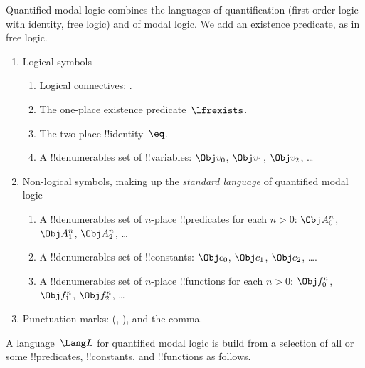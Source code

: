 \documentclass[../../../../include/open-logic-section]{subfiles}
\begin{document}


Quantified modal logic combines the languages of
quantification (first-order logic with identity, free logic) and of
modal logic. We add an existence predicate, as in free logic. 

\begin{enumerate}
\item Logical symbols
\begin{enumerate}
\item Logical connectives:
  \startycommalist
  .
\item The one-place existence predicate~$\lfrexists$.
\item The two-place !!{identity}~$\eq$.
\item A !!{denumerable}s set of !!{variable}s: $\Obj v_0$, $\Obj v_1$, $\Obj
  v_2$, \dots
\end{enumerate}
\item Non-logical symbols, making up the \emph{standard
  language} of quantified modal logic
\begin{enumerate}
\item A !!{denumerable}s set of $n$-place !!{predicate}s for each $n>0$: $\Obj
  A^n_0$, $\Obj A^n_1$, $\Obj A^n_2$, \dots
\item A !!{denumerable}s set of !!{constant}s: $\Obj c_0$, $\Obj c_1$, $\Obj
  c_2$, \dots.
\item A !!{denumerable}s set of $n$-place !!{function}s for each $n>0$:
  $\Obj f^n_0$, $\Obj f^n_1$, $\Obj f^n_2$, \dots
\end{enumerate}
\item Punctuation marks: (, ), and the comma.
\end{enumerate}

A language~$\Lang L$ for quantified modal logic is 
build from a selection of all or some
!!{predicate}s, !!{constant}s, and !!{function}s as follows.
\end{document}

